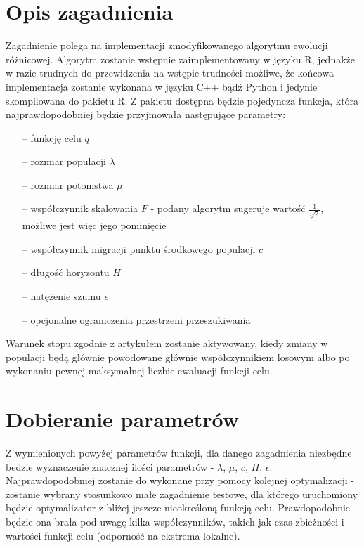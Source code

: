 \section{Opis zagadnienia}
Zagadnienie polega na implementacji zmodyfikowanego algorytmu ewolucji różnicowej. Algorytm zostanie wstępnie zaimplementowany w języku R, jednakże w razie trudnych do przewidzenia na wstępie trudności możliwe, że końcowa implementacja zostanie wykonana w języku C++ bądź Python i jedynie skompilowana do pakietu R. Z pakietu dostępna będzie pojedyncza funkcja, która najprawdopodobniej będzie przyjmowała następujące parametry:

\begin{itemize}
\item[--] funkcję celu $q$
\item[--] rozmiar populacji $\lambda$
\item[--] rozmiar potomstwa $\mu$
\item[--] współczynnik skalowania $F$ - podany algorytm sugeruje wartość $ \frac{1}{\sqrt{2}} $, możliwe jest więc jego pominięcie
\item[--] współczynnik migracji punktu środkowego populacji $c$
\item[--] długość horyzontu $H$
\item[--] natężenie szumu $\epsilon$
\item[--] opcjonalne ograniczenia przestrzeni przeszukiwania
\end{itemize}


Warunek stopu zgodnie z artykułem zostanie aktywowany, kiedy zmiany w populacji będą głównie powodowane głównie współczynnikiem losowym albo po wykonaniu pewnej maksymalnej liczbie ewaluacji funkcji celu.

\section{Dobieranie parametrów}

Z wymienionych powyżej parametrów funkcji, dla danego zagadnienia niezbędne bedzie wyznaczenie znacznej ilości parametrów - $\lambda$, $\mu$, $c$, $H$, $\epsilon$. Najprawdopodobniej zostanie do wykonane przy pomocy kolejnej optymalizacji - zostanie wybrany stosunkowo małe zagadnienie testowe, dla którego uruchomiony będzie optymalizator z bliżej jeszcze nieokreśloną funkcją celu. Prawdopodobnie będzie ona brała pod uwagę kilka współczynników, takich jak czas zbieżności i wartości funkcji celu (odporność na ekstrema lokalne).

